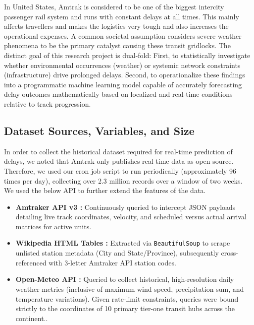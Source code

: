 \documentclass[11pt]{article}
\begin{document}
In United States, Amtrak is considered to be one of the biggest intercity passenger rail system and runs with constant delays at all times. This mainly affects travellers and makes the logistics very tough and also increases the operational expenses.
A common societal assumption considers severe weather phenomena to be the primary catalyst causing these transit gridlocks. The distinct goal of this research project is dual-fold: First, to statistically investigate whether environmental occurrences (weather) or systemic network constraints (infrastructure) drive prolonged delays. Second, to operationalize these findings into a programmatic machine learning model capable of accurately forecasting delay outcomes mathematically based on localized and real-time conditions relative to track progression.



\subsection{Dataset Sources, Variables, and Size}
In order to collect the historical dataset required for real-time prediction of delays, we noted that Amtrak only publishes real-time data as open source. Therefore, we used our cron job script to run periodically (approximately 96 times per day), collecting over 2.3 million records over a window of two weeks. We used the below API to further extend the features of the data.
\begin{itemize}
   \item \textbf{Amtraker API v3 \cite{ref:amtraker}:} Continuously queried to intercept JSON payloads detailing live track coordinates, velocity, and scheduled versus actual arrival matrices for active units.
    \item \textbf{Wikipedia HTML Tables \cite{ref:wiki}:} Extracted via \texttt{BeautifulSoup} to scrape unlisted station metadata (City and State/Province), subsequently cross-referenced with 3-letter Amtraker API station codes.
    \item \textbf{Open-Meteo API \cite{ref:meteo}:} Queried to collect historical, high-resolution daily weather metrics (inclusive of maximum wind speed, precipitation sum, and temperature variations). Given rate-limit constraints, queries were bound strictly to the coordinates of 10 primary tier-one transit hubs across the continent..
\end{itemize}
\end{document}
